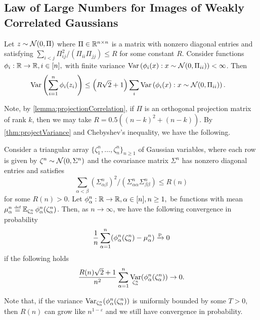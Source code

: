 \documentclass[main.tex]{subfiles}
\begin{document}
\subsection{Law of Large Numbers for Images of Weakly Correlated Gaussians}

\begin{thm}\label{thm:projectVariance}
  Let $z \sim \mathcal{N}(0, \Pi)$ where $\Pi \in \mathbb{R}^{n \times n}$ is a matrix with nonzero diagonal entries and
  satisfying $\sum_{i<j} \Pi_{ij}^2 / (\Pi_{ii} \Pi_{jj}) \le R$
  for some constant $R$.
  Consider functions $\phi_i: \mathbb{R} \to \mathbb{R}, i\in[n],$ with finite variance $\operatorname*{\operatorname{Var}}\left( \phi_i(x) : x \sim \mathcal{N}(0, \Pi_{ii})\right) < \infty$.
  Then
  \begin{align*}
      \operatorname*{\operatorname{Var}}\left(\sum_{i=1}^n \phi_i(z_i)\right)
          &\le
              \left( R\sqrt 2 + 1 \right) \sum_i \operatorname*{\operatorname{Var}}\left( \phi_i(x) : x \sim \mathcal{N}(0, \Pi_{ii})\right).
  \end{align*}
\end{thm}

Note, by \cref{lemma:projectionCorrelation}, if $\Pi$ is an orthogonal projection matrix of rank $k$, then we may take $R = 0.5 ((n - k)^2 + (n-k))$.
By \cref{thm:projectVariance} and Chebyshev's inequality, we have the following.
\begin{cor}
  \label{thm:WeakLLNGaussianImage} Consider a triangular array $\{\zeta_{1}^{n},\ldots,\zeta_{n}^{n}\}_{n\ge1}$ of Gaussian variables, where each row is given by $\zeta^{n}\sim\mathcal{N}(0,\Sigma^{n})$ and the covariance matrix $\Sigma^{n}$ has nonzero diagonal entries and satisfies
  \[\sum_{\alpha<\beta}(\Sigma_{\alpha\beta}^{n})^{2} / (\Sigma_{\alpha\alpha}^n \Sigma_{\beta\beta}^n)\le R(n)\]
  for some $R(n) > 0$.
  Let $\phi^n_\alpha:\mathbb{R}\to\mathbb{R}, \alpha\in[n], n \ge1,$ be functions with mean $\mu_\alpha^n \defeq \EV_{\zeta_\alpha^n} \phi^n_\alpha(\zeta^n_\alpha)$.
  Then, as $n\to\infty$, we have the following convergence in probability
  \begin{align*}
    \frac{1}{n} \sum_{\alpha=1}^n (\phi^n_\alpha(\zeta^n_\alpha) - \mu^n_\alpha) \xrightarrow{\mathrm{p}} 0
  \end{align*}
  if the following holds
  \begin{align*}
    \frac{R(n) \sqrt 2 + 1}{n^2}\sum_{\alpha=1}^n \operatorname*{\operatorname{Var}}_{\zeta^n_\alpha}(\phi^n_\alpha(\zeta^n_\alpha)) \to 0.
  \end{align*}
\end{cor}
Note that, if the variance $\operatorname*{\operatorname{Var}}_{\zeta^n_\alpha}(\phi^n_\alpha(\zeta^n_\alpha))$ is uniformly bounded by some $T>0$, then $R(n)$ can grow like $n^{1-\varepsilon}$ and we still have convergence in probability.
\end{document}
